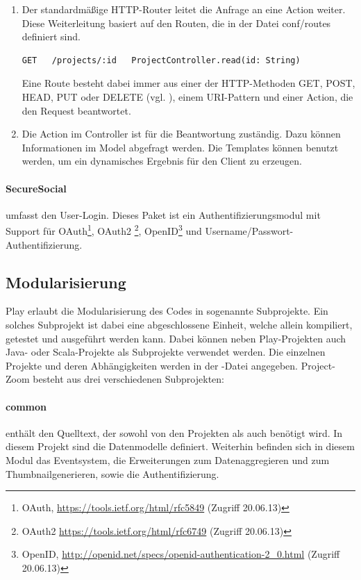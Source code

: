 \begin{enumerate}
  \item Der standardmäßige HTTP-Router leitet die Anfrage an eine Action weiter. Diese Weiterleitung basiert auf den Routen, die in der Datei conf/routes definiert sind.
\begin{lstlisting}
GET   /projects/:id   ProjectController.read(id: String)
\end{lstlisting}
Eine Route besteht dabei immer aus einer der HTTP-Methoden GET, POST, HEAD, PUT oder DELETE (vgl. \cite{play-scala-routing}), einem URI-Pattern und einer Action, die den Request beantwortet.
\item Die Action im Controller ist für die Beantwortung zuständig. Dazu können Informationen im Model abgefragt werden. Die Templates können benutzt werden, um ein dynamisches Ergebnis für den Client zu erzeugen.
\end{enumerate}

\paragraph{SecureSocial} umfasst den User-Login. Dieses Paket ist ein Authentifizierungsmodul mit Support für OAuth\footnote{OAuth, \url{https://tools.ietf.org/html/rfc5849} (Zugriff 20.06.13)}, OAuth2 \footnote{OAuth2 \url{https://tools.ietf.org/html/rfc6749} (Zugriff 20.06.13)}, OpenID\footnote{OpenID, \url{http://openid.net/specs/openid-authentication-2_0.html} (Zugriff 20.06.13)} und Username/Passwort-Authentifizierung. 

\subsection{Modularisierung}
Play erlaubt die Modularisierung des Codes in sogenannte Subprojekte. Ein solches Subprojekt ist dabei eine abgeschlossene Einheit, welche allein kompiliert, getestet und ausgeführt werden kann. Dabei können neben Play-Projekten auch Java- oder Scala-Projekte als Subprojekte verwendet werden. Die einzelnen Projekte und deren Abhängigkeiten werden in der -Datei angegeben.
Project-Zoom besteht aus drei verschiedenen Subprojekten:

\paragraph{common} enthält den Quelltext, der sowohl von den Projekten  als auch  benötigt wird. In diesem Projekt sind die Datenmodelle definiert. Weiterhin befinden sich in diesem Modul das Eventsystem, die Erweiterungen zum Datenaggregieren und zum Thumbnailgenerieren, sowie die Authentifizierung.

